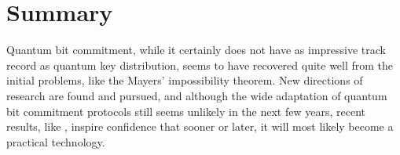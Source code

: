 \documentclass[10pt]{article}
\begin{document}

\section{Summary}

Quantum bit commitment, while it certainly does not have as impressive track record as quantum key
distribution, seems to have recovered quite well from the initial problems, like the Mayers'
impossibility theorem. New directions of research are found and pursued, and although the wide
adaptation of quantum bit commitment protocols still seems unlikely in the next few years, recent 
results, like \cite{Lunghi14}, inspire confidence that sooner or later, it will most likely become
a practical technology.

\nocite{*}



\end{document}
